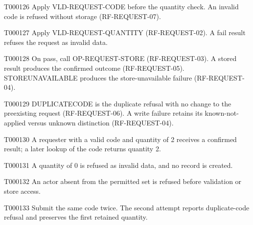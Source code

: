 \documentclass[11pt,a4paper]{article}
\begin{document}
\begin{atlasparagraph}{T000126}
Apply VLD-REQUEST-CODE before the quantity check. An invalid code is refused without storage (RF-REQUEST-07).
\end{atlasparagraph}
\begin{atlasparagraph}{T000127}
Apply VLD-REQUEST-QUANTITY (RF-REQUEST-02). A fail result refuses the request as invalid data.
\end{atlasparagraph}
\begin{atlasparagraph}{T000128}
On pass, call OP-REQUEST-STORE (RF-REQUEST-03). A stored result produces the confirmed outcome (RF-REQUEST-05). STORE\AtlasCharUnderscore{}UNAVAILABLE produces the store-unavailable failure (RF-REQUEST-04).
\end{atlasparagraph}
\begin{atlasparagraph}{T000129}
DUPLICATE\AtlasCharUnderscore{}CODE is the duplicate refusal with no change to the preexisting request (RF-REQUEST-06). A write failure retains its known-not-applied versus unknown distinction (RF-REQUEST-04).
\end{atlasparagraph}
\begin{atlasparagraph}{T000130}
A requester with a valid code and quantity of 2 receives a confirmed result; a later lookup of the code returns quantity 2.
\end{atlasparagraph}
\begin{atlasparagraph}{T000131}
A quantity of 0 is refused as invalid data, and no record is created.
\end{atlasparagraph}
\begin{atlasparagraph}{T000132}
An actor absent from the permitted set is refused before validation or store access.
\end{atlasparagraph}
\begin{atlasparagraph}{T000133}
Submit the same code twice. The second attempt reports duplicate-code refusal and preserves the first retained quantity.
\end{atlasparagraph}
\end{document}
